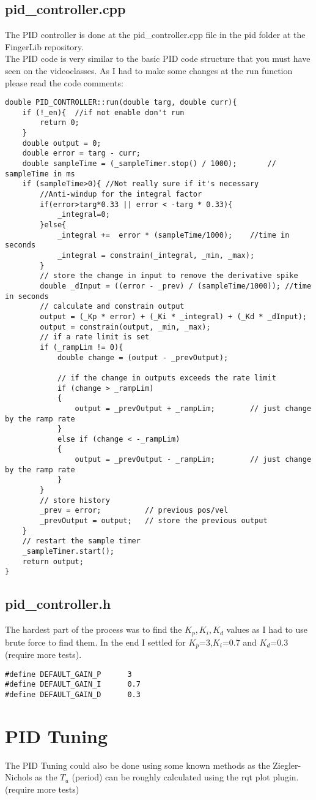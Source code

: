 \documentclass{article}
\begin{document}
\subsection{pid\_controller.cpp}
The PID controller is done at the pid\_controller.cpp file in the pid folder at the FingerLib repository.\\ The PID code is very similar to the basic PID code structure that you must have seen on the videoclasses. As I had to make some changes at the run function please read the code comments:
\pagebreak
\begin{verbatim}
double PID_CONTROLLER::run(double targ, double curr){
    if (!_en){  //if not enable don't run
        return 0;
    }
    double output = 0;
    double error = targ - curr;
    double sampleTime = (_sampleTimer.stop() / 1000);		// sampleTime in ms
    if (sampleTime>0){ //Not really sure if it's necessary
        //Anti-windup for the integral factor
        if(error>targ*0.33 || error < -targ * 0.33){
            _integral=0;
        }else{
            _integral +=  error * (sampleTime/1000);    //time in seconds
            _integral = constrain(_integral, _min, _max);
        }
        // store the change in input to remove the derivative spike
        double _dInput = ((error - _prev) / (sampleTime/1000)); //time in seconds
        // calculate and constrain output
        output = (_Kp * error) + (_Ki * _integral) + (_Kd * _dInput);
        output = constrain(output, _min, _max);
        // if a rate limit is set
        if (_rampLim != 0){
            double change = (output - _prevOutput);

            // if the change in outputs exceeds the rate limit
            if (change > _rampLim)
            {
                output = _prevOutput + _rampLim;		// just change by the ramp rate
            }
            else if (change < -_rampLim)
            {
                output = _prevOutput - _rampLim;		// just change by the ramp rate
            }
        }
        // store history
        _prev = error;			// previous pos/vel
        _prevOutput = output;	// store the previous output
    }
    // restart the sample timer
    _sampleTimer.start();
    return output;
}
\end{verbatim}

\subsection{pid\_controller.h}
The hardest part of the process was to find the $K_p,K_i,K_d$ values as I had to use brute force to find them. In the end I settled for $K_p$=3,$K_i$=0.7 and $K_d$=0.3 (require more tests). 
\begin{verbatim}
#define DEFAULT_GAIN_P		3
#define DEFAULT_GAIN_I		0.7
#define DEFAULT_GAIN_D		0.3

\end{verbatim}

\section{PID Tuning}
The PID Tuning could also be done using some known methods as the Ziegler-Nichols as the $T_u$ (period) can be roughly calculated using the rqt plot plugin. (require more tests)
\end{document}
